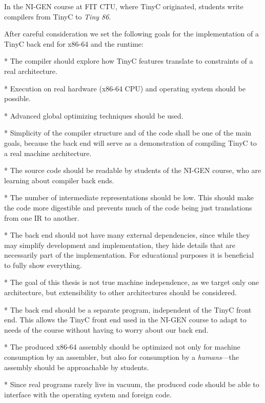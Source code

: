 In the NI-GEN course at FIT CTU, where TinyC originated, students write
compilers from TinyC to {\em Tiny 86}.

After careful consideration we set the following goals for the implementation of
a TinyC back end for x86-64 and the runtime:

\begitems

* The compiler should explore how TinyC features translate to constraints of a
real architecture.

* Execution on real hardware (x86-64 CPU) and operating system should be
possible.

* Advanced global optimizing techniques should be used.

* Simplicity of the compiler structure and of the code shall be one of the main
goals, because the back end will serve as a demonstration of compiling TinyC to a
real machine architecture.

* The source code should be readable by students of the NI-GEN course, who are
learning about compiler back ends.

* The number of intermediate representations should be low. This should make the
code more digestible and prevents much of the code being just translations from
one IR to another.

* The back end should not have many external dependencies, since while they may
simplify development and implementation, they hide details that are necessarily
part of the implementation. For educational purposes it is beneficial to fully
show everything.

* The goal of this thesis is not true machine independence, as we target only
one architecture, but extensibility to other architectures should be considered.



* The back end should be a separate program, independent of the TinyC front end.
This allows the TinyC front end used in the NI-GEN course to adapt to
needs of the course without having to worry about our back end.

* The produced x86-64 assembly should be optimized not only for machine
consumption by an assembler, but also for consumption by a {\em
humans}---the assembly should be approachable by students.

* Since real programs rarely live in vacuum, the produced code should be able to
interface with the operating system and foreign code.

